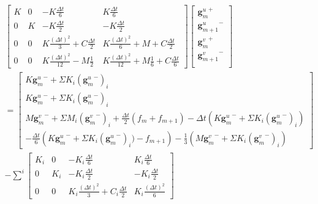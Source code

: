 \documentclass[12pt,a4paper]{report}
\begin{document}
\begin{equation}
\!\!\!\!\!\!\!\!\!\!\!\!\!\!\!\!\!
\begin{array}{c}
		\begin{bmatrix}   
		   		K  &  0  &	-K \frac{\Delta t}{6}   &  K \frac{\Delta t}{6} 
		\\ 	     
			   0  &  K	 &  -K \frac{\Delta t}{2} 	&  -K \frac{\Delta t}{2}
		\\   
		   		0  &  0  &  	K
			   						\frac{(\Delta t)^2}{3} 
		   							+C \frac{\Delta t}{2}
		   	&
		   		K \frac{(\Delta t)^2}{6} 
		   		+M 
			   	+C \frac{\Delta t}{2}
		\\    
		   		0 	&  0  &  K \frac{(\Delta t)^2}{12}
						   		-M \frac{1}{2} 
		   	&
		   		K \frac{(\Delta t)^2}{12}
		   		+M \frac{1}{6} 
			   +C \frac{\Delta t}{6} 
	\end{bmatrix}
		\begin{bmatrix}
		   {\mathbf{g}^u_m}^+  		\\
		   {\mathbf{g}^u_{m+1}}^-  	\\
		   {\mathbf{g}^v_m}^+  		\\
		   {\mathbf{g}^v_{m+1}}^-  	\\
		\end{bmatrix}
	\\ =	
	\begin{bmatrix}	
		  K {\mathbf{g}^u_m}^- + \Sigma K_i ({\mathbf{g}^u_m}^-)_i
		\\ K {\mathbf{g}^u_m}^- + \Sigma K_i ({\mathbf{g}^u_m}^-)_i
		\\ 	 M {\mathbf{g}^v_m}^- + \Sigma M_i ({\mathbf{g}^v_m}^-)_i
		     			+\frac{\Delta t}{2}  (f_m + f_{m+1})
			-\Delta t
			 \left(  K {\mathbf{g}^u_m}^- + \Sigma K_i ({\mathbf{g}^u_m}^-)_i 
			  \right)
		\\-\frac{\Delta t}{6}
				\left( K {\mathbf{g}^u_m}^- + \Sigma K_i ({\mathbf{g}^u_m}^- )_i )
						-f_{m+1}
				\right)
			- \frac{1}{3}  (M {\mathbf{g}^v_m}^- + \Sigma K_i ({\mathbf{g}^v_m}^-)_i )
	\end{bmatrix}
	\\
	- \displaystyle \sum^i
		\begin{bmatrix}   
		   		K_i  &  0  &  -K_i \frac{\Delta t}{6}  &  K_i \frac{\Delta t}{6} 
		\\ 	     
			   0  &  K_i  &  -K_i \frac{\Delta t}{2}  &  -K_i \frac{\Delta t}{2}
		\\   
		   		0  &  0  &  K_i
						   		\frac{(\Delta t)^2}{3} 
					   			+C_i \frac{\Delta t}{2}
		   	&
		   		K_i \frac{(\Delta t)^2}{6} 

\end{bmatrix}
\end{array}
\end{equation}
\end{document}

